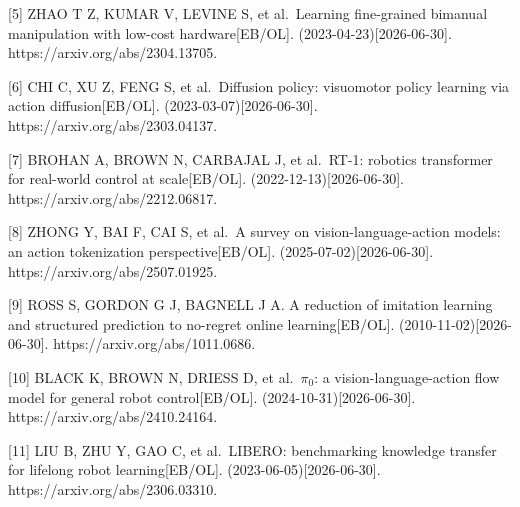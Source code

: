 \documentclass[
  chinese,
]{ctexart}
\begin{document}
{[}5{]} ZHAO T Z, KUMAR V, LEVINE S, et al.~Learning fine-grained
bimanual manipulation with low-cost hardware{[}EB/OL{]}.
(2023-04-23){[}2026-06-30{]}. https://arxiv.org/abs/2304.13705.

{[}6{]} CHI C, XU Z, FENG S, et al.~Diffusion policy: visuomotor policy
learning via action diffusion{[}EB/OL{]}. (2023-03-07){[}2026-06-30{]}.
https://arxiv.org/abs/2303.04137.

{[}7{]} BROHAN A, BROWN N, CARBAJAL J, et al.~RT-1: robotics transformer
for real-world control at scale{[}EB/OL{]}.
(2022-12-13){[}2026-06-30{]}. https://arxiv.org/abs/2212.06817.

{[}8{]} ZHONG Y, BAI F, CAI S, et al.~A survey on vision-language-action
models: an action tokenization perspective{[}EB/OL{]}.
(2025-07-02){[}2026-06-30{]}. https://arxiv.org/abs/2507.01925.

{[}9{]} ROSS S, GORDON G J, BAGNELL J A. A reduction of imitation
learning and structured prediction to no-regret online
learning{[}EB/OL{]}. (2010-11-02){[}2026-06-30{]}.
https://arxiv.org/abs/1011.0686.

{[}10{]} BLACK K, BROWN N, DRIESS D, et al.~\(\pi_0\): a
vision-language-action flow model for general robot control{[}EB/OL{]}.
(2024-10-31){[}2026-06-30{]}. https://arxiv.org/abs/2410.24164.

{[}11{]} LIU B, ZHU Y, GAO C, et al.~LIBERO: benchmarking knowledge
transfer for lifelong robot learning{[}EB/OL{]}.
(2023-06-05){[}2026-06-30{]}. https://arxiv.org/abs/2306.03310.
\end{document}
